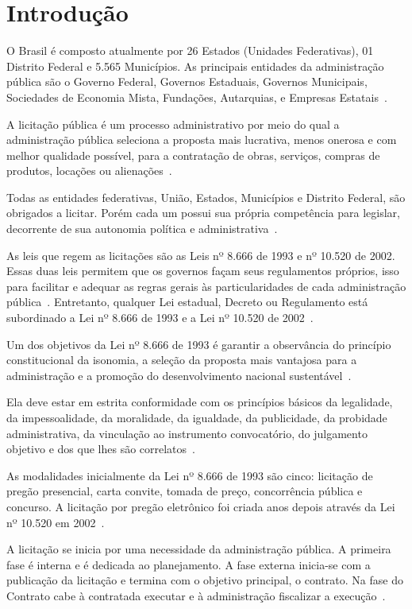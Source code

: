 \chapter*[Introdução]{Introdução}

O Brasil é composto atualmente por 26 Estados (Unidades Federativas), 01 Distrito Federal e 5.565 Municípios.
As principais entidades da administração pública são o Governo Federal, Governos Estaduais, Governos Municipais, Sociedades de Economia Mista, Fundações, Autarquias, e Empresas Estatais~\cite{thesing2012municipios}.

A licitação pública é um processo administrativo por meio do qual a administração pública seleciona a proposta mais lucrativa, menos onerosa e com melhor qualidade possível, para a contratação de obras, serviços, compras de produtos, locações ou alienações~\cite{l2300}.

Todas as entidades federativas, União, Estados, Municípios e Distrito Federal, são obrigados a licitar. 
Porém cada um possui sua própria competência para legislar, decorrente de sua autonomia política e administrativa~\cite{l8666}.

As leis que regem as licitações são as Leis nº 8.666 de 1993 e nº 10.520 de 2002. 
Essas duas leis permitem que os governos façam seus regulamentos próprios, isso para facilitar e adequar as regras gerais às particularidades de cada administração pública~\cite{123}.
Entretanto, qualquer Lei estadual, Decreto ou Regulamento está subordinado a Lei nº 8.666 de 1993 e a Lei nº 10.520 de 2002~\cite{123}. 

Um dos objetivos da Lei nº 8.666 de 1993 é garantir a observância do princípio constitucional da isonomia, a seleção da proposta mais vantajosa para a administração e a promoção do desenvolvimento nacional sustentável~\cite{l8666}.

Ela deve estar em estrita conformidade com os princípios básicos da legalidade, da impessoalidade, da moralidade, da igualdade, da publicidade, da probidade administrativa, da vinculação ao instrumento convocatório, do julgamento objetivo e dos que lhes são correlatos~\cite{l8666}.

As modalidades inicialmente da Lei nº 8.666 de 1993 são cinco: licitação de pregão presencial, carta convite, tomada de preço, concorrência pública e concurso. 
A licitação por pregão eletrônico foi criada anos depois através da Lei nº 10.520 em 2002~\cite{l10529}.

A licitação se inicia por uma necessidade da administração pública. 
A primeira fase é interna e é dedicada ao planejamento. 
A fase externa inicia-se com a publicação da licitação e termina com o objetivo principal, o contrato. 
Na fase do Contrato cabe à contratada executar e à administração fiscalizar a execução~\cite{camarao2013fase}.

